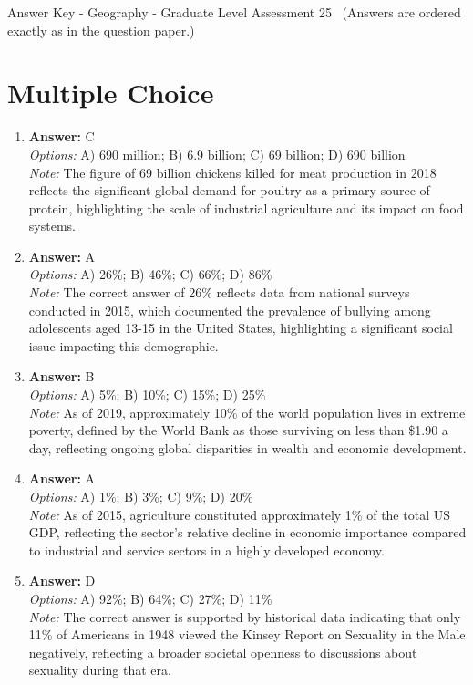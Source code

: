 \documentclass[12pt]{article}
\begin{document}
\begin{center}
Answer Key - Geography - Graduate Level Assessment 25 \
\small (Answers are ordered exactly as in the question paper.)
\end{center}

\section*{Multiple Choice}
\begin{enumerate}[label=\arabic*.]
\item \textbf{Answer:} C
\\ \textit{Options:} A) 690 million; B) 6.9 billion; C) 69 billion; D) 690 billion
\\ \textit{Note:} The figure of 69 billion chickens killed for meat production in 2018 reflects the significant global demand for poultry as a primary source of protein, highlighting the scale of industrial agriculture and its impact on food systems.
\item \textbf{Answer:} A
\\ \textit{Options:} A) 26\%; B) 46\%; C) 66\%; D) 86\%
\\ \textit{Note:} The correct answer of 26\% reflects data from national surveys conducted in 2015, which documented the prevalence of bullying among adolescents aged 13-15 in the United States, highlighting a significant social issue impacting this demographic.
\item \textbf{Answer:} B
\\ \textit{Options:} A) 5\%; B) 10\%; C) 15\%; D) 25\%
\\ \textit{Note:} As of 2019, approximately 10\% of the world population lives in extreme poverty, defined by the World Bank as those surviving on less than \$1.90 a day, reflecting ongoing global disparities in wealth and economic development.
\item \textbf{Answer:} A
\\ \textit{Options:} A) 1\%; B) 3\%; C) 9\%; D) 20\%
\\ \textit{Note:} As of 2015, agriculture constituted approximately 1\% of the total US GDP, reflecting the sector's relative decline in economic importance compared to industrial and service sectors in a highly developed economy.
\item \textbf{Answer:} D
\\ \textit{Options:} A) 92\%; B) 64\%; C) 27\%; D) 11\%
\\ \textit{Note:} The correct answer is supported by historical data indicating that only 11\% of Americans in 1948 viewed the Kinsey Report on Sexuality in the Male negatively, reflecting a broader societal openness to discussions about sexuality during that era.
\end{enumerate}
\end{document}
